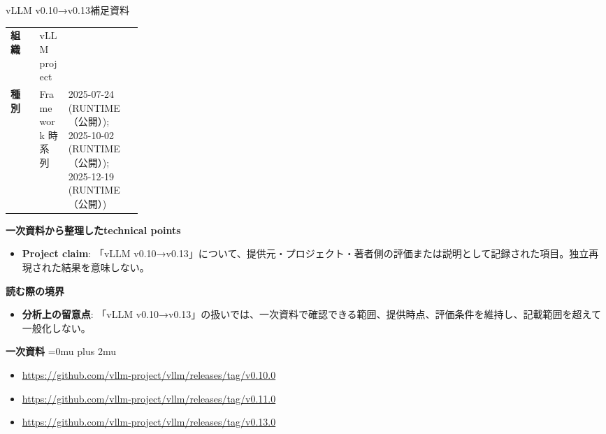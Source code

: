 \begin{technicalnote}{vLLM v0.10→v0.13}{補足資料}
\begingroup
\begin{tabularx}{\linewidth}{@{}>{\bfseries}p{0.22\linewidth}X@{}}
組織 & vLLM project \\
種別 & Framework
時系列 & 2025-07-24 (RUNTIME（公開）); 2025-10-02 (RUNTIME（公開）); 2025-12-19 (RUNTIME（公開）) \\
\end{tabularx}
\smallskip
{\bfseries 一次資料から整理したtechnical points}
\begin{itemize}[leftmargin=1.5em,itemsep=0.35em]
\item \textbf{Project claim}: 「vLLM v0.10→v0.13」について、提供元・プロジェクト・著者側の評価または説明として記録された項目。独立再現された結果を意味しない。
\end{itemize}
\begin{minipage}{\linewidth}
{\bfseries 読む際の境界}
\begin{itemize}[leftmargin=1.5em,itemsep=0.35em]
\item \textbf{分析上の留意点}: 「vLLM v0.10→v0.13」の扱いでは、一次資料で確認できる範囲、提供時点、評価条件を維持し、記載範囲を超えて一般化しない。
\end{itemize}
\begin{samepage}
{\bfseries 一次資料}
\begingroup\sloppy
\Urlmuskip=0mu plus 2mu\relax
\begin{itemize}[leftmargin=1.5em,itemsep=0.25em]
\item {\scriptsize\url{https://github.com/vllm-project/vllm/releases/tag/v0.10.0}}
\item {\scriptsize\url{https://github.com/vllm-project/vllm/releases/tag/v0.11.0}}
\item {\scriptsize\url{https://github.com/vllm-project/vllm/releases/tag/v0.13.0}}
\end{itemize}
\endgroup
\end{samepage}
\end{minipage}
\endgroup
\end{technicalnote}
\medskip

